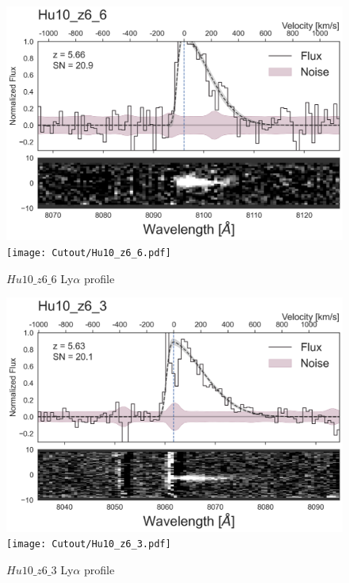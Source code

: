 \documentclass[12pt,english]{article}
\begin{document}
\begin{figure}
\begin{center}\includegraphics[width=12cm, trim=0.1cm 0cm 0cm -1cm]{LyaProfiles/Hu10_z6_6.png}
\texttt{[image: Cutout/Hu10\_z6\_6.pdf]}
\caption{$Hu10\_z6\_6$ Ly$\alpha$ profile}
\end{center}
\end{figure}
\clearpage
\begin{figure}
\begin{center}\includegraphics[width=12cm, trim=0.1cm 0cm 0cm -1cm]{LyaProfiles/Hu10_z6_3.png}
\texttt{[image: Cutout/Hu10\_z6\_3.pdf]}
\caption{$Hu10\_z6\_3$ Ly$\alpha$ profile}
\end{center}
\end{figure}
\clearpage
\end{document}
